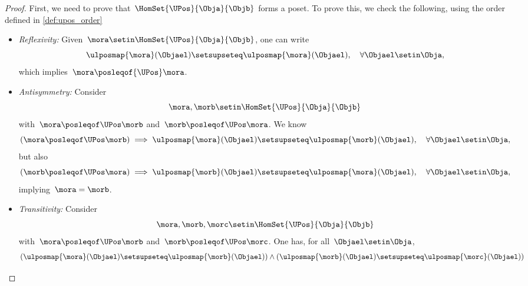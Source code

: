\begin{proof}
    First, we need to prove that~$\HomSet{\UPos}{\Obja}{\Objb}$ forms a poset.
    To prove this, we check the following, using the order defined in \cref{def:upos_order}
    \begin{itemize}
        \item \emph{Reflexivity:} Given~$\mora \setin \HomSet{\UPos}{\Obja}{\Objb}$, one can write
              \begin{equation}
                  \ulposmap{\mora}(\Objael) \setsupseteq \ulposmap{\mora}(\Objael), \quad \forall \Objael \setin \Obja,
              \end{equation}
              which implies~$\mora \posleqof{\UPos} \mora$.
        \item \emph{Antisymmetry:}
              Consider
              \begin{equation}
                  \mora,\morb \setin \HomSet{\UPos}{\Obja}{\Objb}
              \end{equation} with~$\mora \posleqof\UPos \morb$ and~$\morb \posleqof\UPos \mora$.
              We know
              \begin{equation}
                  (\mora \posleqof\UPos \morb)
                  \implies \ulposmap{\mora}(\Objael) \setsupseteq \ulposmap{\morb}(\Objael), \quad \forall \Objael \setin \Obja,
              \end{equation}
              but also
              \begin{equation}
                  (\morb \posleqof\UPos \mora)
                  \implies \ulposmap{\morb}(\Objael) \setsupseteq \ulposmap{\mora}(\Objael), \quad \forall \Objael \setin \Obja,
              \end{equation}
              implying~$\mora=\morb$.
        \item \emph{Transitivity:}
              Consider
              \begin{equation}
                  \mora,\morb,\morc \setin \HomSet{\UPos}{\Obja}{\Objb}
              \end{equation}
              with~$\mora \posleqof\UPos \morb$ and~$\morb \posleqof\UPos \morc$.
              One has, for all~$\Objael\setin \Obja$,
              \begin{equation}
                  \begin{aligned}
                      (\ulposmap{\mora}(\Objael) \setsupseteq \ulposmap{\morb}(\Objael))
                      \wedge ( \ulposmap{\morb}(\Objael) \setsupseteq \ulposmap{\morc}(\Objael))

\end{aligned}
\end{equation}
\end{itemize}
\end{proof}
